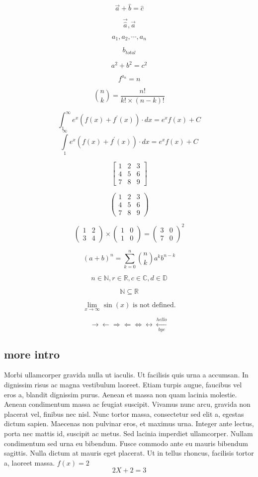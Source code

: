 \documentclass[a4paper,12pt]{article}
\newcommand{\N}{\mathbb{N}}
\newcommand{\R}{\mathbb{R}}
\begin{document}
	$$\vec{a} + \hat{b} = \hat{c} $$
	
	$$\vec{\hat{a}}, \hat{\vec{a}}$$
	
	$$a_1, a_2, \cdots, a_n$$
	
	$$b_{total}$$
	
	$$a^2 + b^2 = c^2$$
	
	$$f^{a_n} = n$$
	
	$$\binom{n}{k} = \frac{n!}{k! \times (n - k)!}$$
	
	$$\int_{1}^{\infty} e^x(f(x) + f^{'}(x) ) \cdot dx = e^xf(x) + C$$
	$$\int\limits_{1}^{\infty} e^x(f(x) + f^{'}(x) ) \cdot dx = e^xf(x) + C$$
	
	$$
	\begin{bmatrix}
	1 & 2 & 3 \\
	4 & 5 & 6 \\
	7 & 8 & 9
	\end{bmatrix}
	$$
	
	$$
	\begin{pmatrix}
	1 & 2 & 3 \\
	4 & 5 & 6 \\
	7 & 8 & 9
	\end{pmatrix}
	$$
	
	$$\begin{pmatrix}
	1 & 2\\
	3 & 4
	\end{pmatrix} \times \begin{pmatrix}
	1 & 0\\
	1 & 0
	\end{pmatrix} = \begin{pmatrix}
	3 & 0\\
	7 & 0
	\end{pmatrix}^2$$
	
	$$(a + b)^n = \sum_{k=0}^{n} \binom{n}{k} a^k b^{n-k}$$
	
	$$n \in \mathbb{N}, r \in \mathbb{R}, c \in \mathbb{C}, d \in \mathbb{D}$$
	
	$$\N \subseteq \R$$
	
	$$\lim_{x \to \infty} \sin(x) \text{ is not defined.}$$
	
	$$\rightarrow \leftarrow \Rightarrow \Leftarrow \Leftrightarrow \leftrightarrow \xleftarrow[bye]{hello}$$
	\subsection{more intro}
	
	Morbi ullamcorper gravida nulla ut iaculis. Ut facilisis quis urna a accumsan. In dignissim risus ac magna vestibulum laoreet. Etiam turpis augue, faucibus vel eros a, blandit dignissim purus. Aenean et massa non quam lacinia molestie. Aenean condimentum massa ac feugiat suscipit. Vivamus nunc arcu, gravida non placerat vel, finibus nec nisl. Nunc tortor massa, consectetur sed elit a, egestas dictum sapien. Maecenas non pulvinar eros, et maximus urna. Integer ante lectus, porta nec mattis id, suscipit ac metus. Sed lacinia imperdiet ullamcorper. Nullam condimentum sed urna eu bibendum. Fusce commodo ante eu mauris bibendum sagittis. Nulla dictum at mauris eget placerat. Ut in tellus rhoncus, facilisis tortor a, laoreet massa. \(f(x) = 2\)
	$$ 2X + 2 = 3 $$
	
\end{document}
